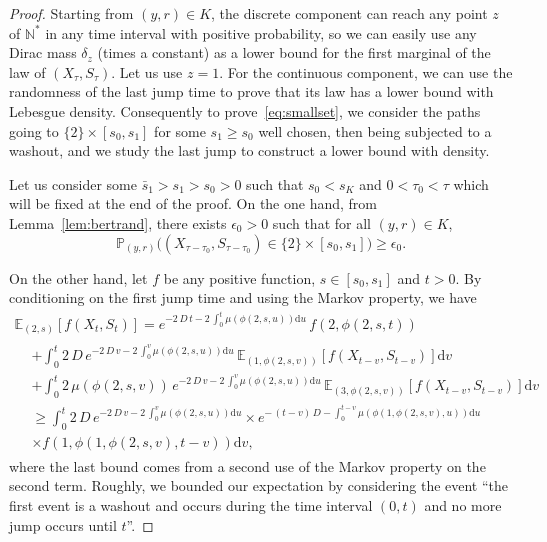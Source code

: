 \documentclass[AHL,Unicode,longabstracts,published]{cedram}
\newcommand{\PP}{\mathbb{P}}
\newcommand{\NN}{\mathbb{N}}
\newcommand{\EE}{\mathbb{E}}
\newcommand{\dif}{\mathrm{d}}
\newcommand{\1}{\mathbf{1}}
\begin{document}
\begin{proof}
Starting from $(y,r) \in K$, the discrete component can reach any point $z$ of $\NN^*$ in any time interval with positive probability, so we can easily use any Dirac mass $\delta_z$ (times a constant) as a lower bound for the first marginal of the law of $(X_\tau, S_\tau)$. Let us use $z=1$. For the continuous component, we can use the randomness of the last jump time to prove that its law has a lower bound with Lebesgue density. Consequently to prove~\eqref{eq:smallset}, we consider the paths going to $\{2\} \times [s_0,s_1]$ for some $s_1\geq s_0$ well chosen, then being subjected to a washout, and we study the last jump to construct a lower bound with density.

Let us consider some $\bar s_1> s_1>s_0>0$ such that $s_0<s_K$ and $0<\tau_0<\tau$ which will be fixed at the end of the proof. On the one hand, from Lemma~\ref{lem:bertrand}, there exists $\epsilon_0>0$ such that for all $(y,r)\in K$,
\begin{equation}\label{eq:smallsetpresque0}
\PP_{(y,r)}\big((X_{\tau-\tau_0},S_{\tau-\tau_0})\in \{2\}\times [s_0,s_1]\big) \geq \epsilon_0.
\end{equation}

On the other hand, let $f$ be any positive function, $s \in [s_0,s_1]$ and $t>0$. By conditioning on the first jump time and using the Markov property, we have
\begin{multline*}
\EE_{(2,s)}\left[f(X_t,S_t)\right]
= e^{-2\,D\, t - 2\,\int_0^t \mu (\phi(2,s,u)) \dif u} \,f\left(2, \phi(2,s,t)\right)\\
\begin{aligned}
&+ \int_0^t 2\,D \,e^{-2\,D\, v - 2\,\int_0^v \mu (\phi(2,s,u)) \dif u} \,\EE_{(1,\phi(2,s,v))}\left[f(X_{t-v},S_{t-v})\right] \dif v\\
&+ \int_0^t 2\,\mu (\phi(2,s,v)) \, e^{-2\,D\,v - 2\,\int_0^v \mu (\phi(2,s,u)) \dif u} \,
\EE_{(3,\phi(2,s,v))}\left[f(X_{t-v},S_{t-v})\right] \dif v\\
&\geq \int_0^t 2\,D \, e^{-2\,D \, v - 2\,\int_0^v \mu (\phi(2,s,u)) \dif u} \times e^{-\, (t-v)\,D - \int_0^{t-v} \mu (\phi(1,\phi(2,s,v),u)) \dif u} \\
&\times f\left(1, \phi(1,\phi(2,s,v),t-v)\right) \dif v,
\end{aligned}
\end{multline*}
where the last bound comes from a second use of the Markov property on the second term. Roughly, we bounded our expectation by considering the event ``the first event is a washout and occurs during the time interval $(0,t)$ and no more jump occurs until $t$''.



\end{proof}
\end{document}
